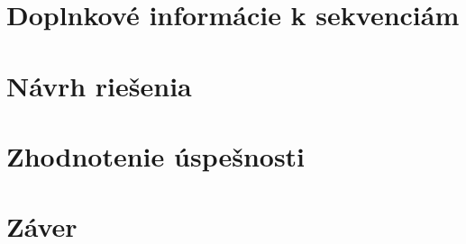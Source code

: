 


\chapter{Doplnkové informácie k sekvenciám}

\chapter{Návrh riešenia}

\chapter{Zhodnotenie úspešnosti}
\chapter*{Záver}
